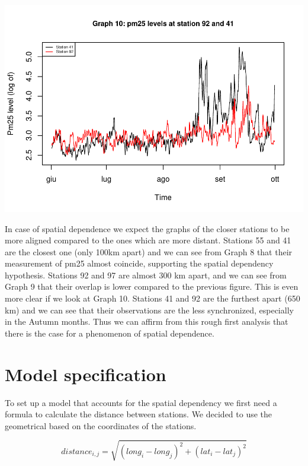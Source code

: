 \documentclass[
]{article}
\begin{document}
\begin{center}\includegraphics[width=0.75\linewidth,height=0.75\textheight]{finalproject_files/figure-latex/Graph 10-1} \end{center}

In case of spatial dependence we expect the graphs of the closer
stations to be more aligned compared to the ones which are more distant.
Stations 55 and 41 are the closest one (only 100km apart) and we can see
from Graph 8 that their measurement of pm25 almost coincide, supporting
the spatial dependency hypothesis. Stations 92 and 97 are almost 300 km
apart, and we can see from Graph 9 that their overlap is lower compared
to the previous figure. This is even more clear if we look at Graph 10.
Stations 41 and 92 are the furthest apart (650 km) and we can see that
their observations are the less synchronized, especially in the Autumn
months. Thus we can affirm from this rough first analysis that there is
the case for a phenomenon of spatial dependence.

\hypertarget{model-specification}{%
\section{Model specification}\label{model-specification}}

To set up a model that accounts for the spatial dependency we first need
a formula to calculate the distance between stations. We decided to use
the geometrical based on the coordinates of the stations.

\[
distance_{i,j} = \sqrt{{(long_{i}-long_{j} )^2 + (lat_{i}-lat_{j})^2}}
\]
\end{document}
